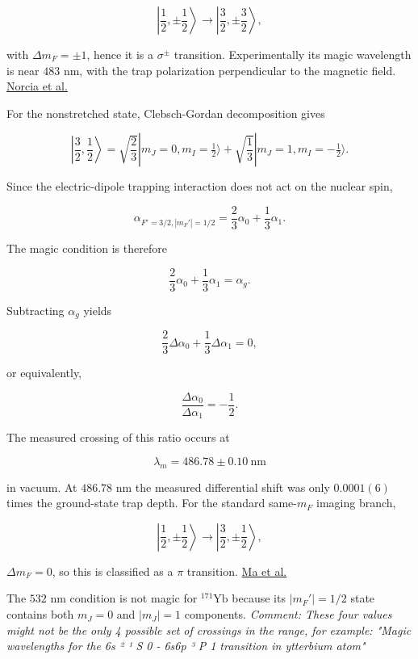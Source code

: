 \[
\left|\frac12,\pm\frac12\right\rangle \longrightarrow \left|\frac32,\pm\frac32\right\rangle,
\]

with $\Delta m_F=\pm1$, hence it is a $\sigma^\pm$ transition. Experimentally its magic wavelength is near $483$ nm, with the trap polarization perpendicular to the magnetic field. \href{\detokenize{https://arxiv.org/abs/2305.19119}}{Norcia et al.}

For the nonstretched state, Clebsch-Gordan decomposition gives

\[
\left|\frac32,\frac12\right\rangle = \sqrt{\frac23} |m_J=0,m_I=\tfrac12\rangle + \sqrt{\frac13} |m_J=1,m_I=-\tfrac12\rangle.
\]

Since the electric-dipole trapping interaction does not act on the nuclear spin,

\[
\alpha_{F'=3/2,|m_F'|=1/2} = \frac23\alpha_0+\frac13\alpha_1.
\]

The magic condition is therefore

\[
\frac23\alpha_0+\frac13\alpha_1=\alpha_g.
\]

Subtracting $\alpha_g$ yields

\[
\frac23\Delta\alpha_0+\frac13\Delta\alpha_1=0,
\]

or equivalently,

\[
{\frac{\Delta\alpha_0}{\Delta\alpha_1}=-\frac12}.
\]

The measured crossing of this ratio occurs at

\[
{\lambda_m=486.78\pm0.10\ \mathrm{nm}}
\]

in vacuum. At $486.78$ nm the measured differential shift was only $0.0001(6)$ times the ground-state trap depth. For the standard same-$m_F$ imaging branch,

\[
\left|\frac12,\pm\frac12\right\rangle \longrightarrow \left|\frac32,\pm\frac12\right\rangle,
\]

$\Delta m_F=0$, so this is classified as a $\pi$ transition. \href{\detokenize{https://arxiv.org/abs/2112.06799}}{Ma et al.}


The $532$ nm condition is not magic for $^{171}\mathrm{Yb}$ because its $|m_F'|=1/2$ state contains both $m_J=0$ and $|m_J|=1$ components.
{\textit{Comment: These four values might not be the only 4 possible set of crossings in the range, for example: "Magic wavelengths for the 6s ² ¹ S 0 - 6s6p ³ P 1 transition in ytterbium atom"}}
